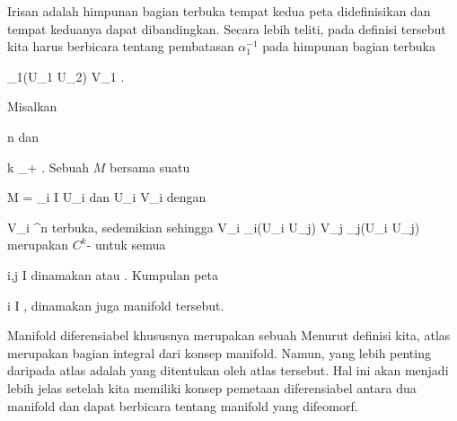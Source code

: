 Irisan  adalah himpunan bagian terbuka tempat kedua peta didefinisikan dan tempat keduanya dapat dibandingkan. Secara lebih teliti, pada definisi tersebut kita harus berbicara tentang pembatasan $\alpha_1^{-1}$ pada himpunan bagian terbuka

\mavergleichskette
{\vergleichskette
{ \alpha_1(U_1 \cap U_2)
}
{ \subseteq }{ V_1
}
{  }{
}
{    }{
}
{   }{
}
}
{}{}{}.

{}
{

Misalkan

\mavergleichskette
{\vergleichskette
{ n
}
{ \in }{ \N
}
{  }{
}
{    }{
}
{   }{
}
}
{}{}{}
dan

\mavergleichskette
{\vergleichskette
{ k
}
{ \in }{ \overline{ \N }_+
}
{  }{
}
{    }{
}
{   }{
}
}
{}{}{.}
Sebuah
$M$ bersama suatu

\mavergleichskette
{\vergleichskette
{ M
}
{ = }{ \bigcup_{i \in I} U_i
}
{  }{
}
{    }{
}
{   }{
}
}
{}{}{}
dan
 {U_i } { V_i
} {}
dengan

\mavergleichskette
{\vergleichskette
{ V_i
}
{ \subseteq }{ \R^n
}
{  }{
}
{    }{
}
{   }{
}
}
{}{}{}
terbuka, sedemikian sehingga
 {V_i \cap \alpha_i(U_i \cap U_j) } { V_j \cap \alpha_j(U_i \cap U_j)
} {}
merupakan
$C^k$-
untuk semua

\mavergleichskette
{\vergleichskette
{ i,j
}
{ \in }{ I
}
{  }{
}
{    }{
}
{   }{
}
}
{}{}{}
dinamakan
atau 
 {} {.} Kumpulan peta

 {}
 {i \in I} {}
 {} {} {} {,}
dinamakan juga
manifold tersebut.

}

Manifold diferensiabel khususnya merupakan sebuah
Menurut definisi kita, atlas merupakan bagian integral dari konsep manifold. Namun, yang lebih penting daripada atlas adalah  {} yang ditentukan oleh atlas tersebut. Hal ini akan menjadi lebih jelas setelah kita memiliki konsep pemetaan diferensiabel antara dua manifold dan dapat berbicara tentang manifold yang difeomorf.

